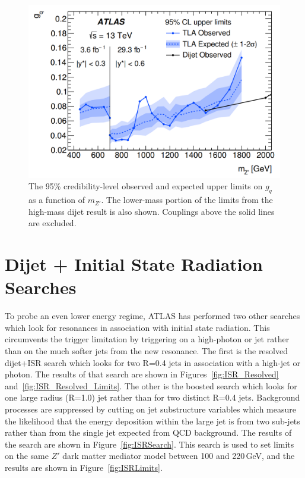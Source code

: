 \begin{figure}[ht!]
	\centering
	\includegraphics[width=0.7\columnwidth]{figures/Conclusion/TLA_Limits.png}
	\caption{The 95\% credibility-level observed and expected upper limits on $g_q$ as a function of $m_{Z'}$.  The lower-mass portion of the limits from the high-mass dijet result is also shown.  Couplings above the solid lines are excluded.}
	\label{fig:TLA_Limits}
\end{figure}

\section{Dijet + Initial State Radiation Searches}

To probe an even lower energy regime, ATLAS has performed two other searches which look for resonances in association with initial state radiation.  This circumvents the trigger limitation by triggering on a high-\pt photon or jet rather than on the much softer jets from the new resonance.  The first is the resolved dijet+ISR search which looks for two R=0.4 jets in association with a high-\pt jet or photon.\cite{DijetISR_Resolved}  The results of that search are shown in Figures~\ref{fig:ISR_Resolved} and~\ref{fig:ISR_Resolved_Limits}. The other is the boosted search which looks for one large radius (R=1.0) jet rather than for two distinct R=0.4 jets.\cite{DijetISR}  Background processes are suppressed by cutting on jet substructure variables which measure the likelihood that the energy deposition within the large jet is from two sub-jets rather than from the single jet expected from QCD background.  The results of the search are shown in Figure~\ref{fig:ISRSearch}.  This search is used to set limits on the same $Z'$ dark matter mediator model between 100 and 220\,GeV, and the results are shown in Figure~\ref{fig:ISRLimits}.

